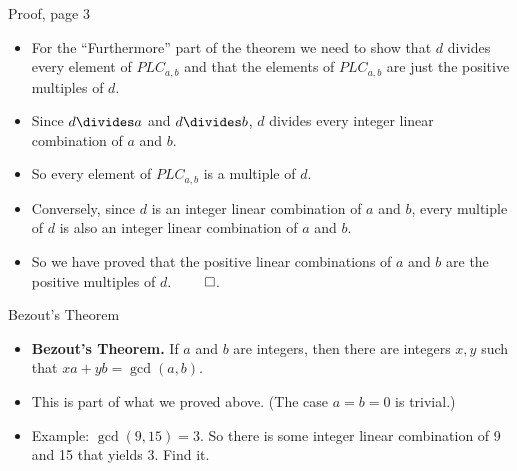 \documentclass{beamer}
\begin{document}
\begin{frame}{Proof, page 3}

\begin{itemize}
  \item For the ``Furthermore'' part of the theorem we need to show that $d$ divides every element
  of $PLC_{a,b}$ and that the elements of $PLC_{a,b}$ are just the positive multiples of $d$.
  \item Since $d\divides a$ and $d\divides b$, $d$ divides every integer linear combination of $a$ and $b$.
  \item So every element of $PLC_{a,b}$ is a multiple of $d$.
  \item Conversely, since $d$ is an integer linear combination of $a$ and $b$, every multiple of $d$
  is also an integer linear combination of $a$ and $b$.
  \item So we have proved that the positive linear combinations of $a$ and $b$ are the positive multiples of $d$. $\qed$.
\end{itemize}

\end{frame}


\begin{frame}{Bezout's Theorem}

\begin{itemize}
  \item \textbf{Bezout's Theorem.} If $a$ and $b$ are integers, then there are integers $x,y$ such
  that $xa + yb = \gcd(a,b)$.
  \item This is part of what we proved above. (The case $a=b=0$ is trivial.)
  \item Example: $\gcd(9,15) = 3$. So there is some integer linear combination of 9 and 15 that yields 3. Find it.
\end{itemize}

\end{frame}
\end{document}
